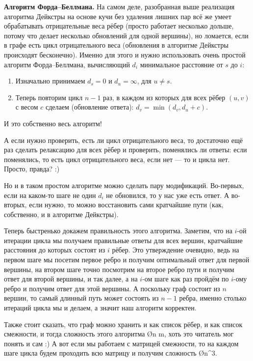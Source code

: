 \textbf{Алгоритм Форда–Беллмана.} На самом деле, разобранная выше реализация алгоритма Дейкстры на основе кучи без удаления лишних пар всё же умеет обрабатывать отрицательные веса рёбер (просто работает несколько дольше, потому что делает несколько обновлений для одной вершины), но ломается, если в графе есть цикл отрицательного веса (обновления в алгоритме Дейкстры происходят бесконечно). Именно для этого и нужно использовать очень простой алгоритм Форда–Беллмана, вычисляющий $d_i$ минимальное расстояние от $s$ до $i$:

\begin{box-algo}
    \begin{enumerate}
        \item Изначально принимаем $d_s = 0$ и $d_u = \infty$, для $u \ne s$.
        \item Теперь повторим цикл $n-1$ раз, в каждом из которых для всех рёбер $(u, v)$ с весом $c$ сделаем  (обновление ответа): $d_v = \min(d_v, d_u + c)$. 
    \end{enumerate}
\end{box-algo}

И это собственно весь алгоритм!

А если нужно проверить, есть ли цикл отрицательного веса, то достаточно ещё раз сделать релаксацию для всех рёбер и проверить, поменялись ли ответы: если поменялись, то есть цикл отрицательного веса, если нет — то и цикла нет. Просто, правда? :)

Но и в таком простом алгоритме можно сделать пару модификаций. Во-первых, если на каком-то шаге не один $d_i$ не обновился, то у нас уже есть ответ. А во-вторых, если нужно, то можно восстановить сами кратчайшие пути (как, собственно, и в алгоритме Дейкстры).

Теперь быстренько докажем правильность этого алгоритма. Заметим, что на $i$-ой итерации цикла мы получаем правильные ответы для всех вершин, кратчайшие расстояния до которых состоят из $i$ рёбер. Это утверждение очевидно, ведь на первом шаге мы посетим первое ребро и получим оптимальный ответ для первой вершины, на втором шаге точно посмотрим на второе ребро пути и получим ответ для второй вершины, и так далее, а на $i$-ом шаге как раз пройдём по $i$-ому ребро и получим ответ для этой вершины. А поскольку граф состоит из $n$ вершин, то самый длинный путь может состоять из $n - 1$ ребра, именно столько итераций цикла мы и делаем, а значит наш алгоритм корректен.

Также стоит сказать, что граф можно хранить и как список рёбер, и как список смежности, и тогда сложность этого алгоритма \O{n m}, хоть это читатель мог понять и сам :) А вот если мы работаем с матрицей смежности, то на каждом шаге цикла будем проходить всю матрицу и получим сложность \O{n^3}.


